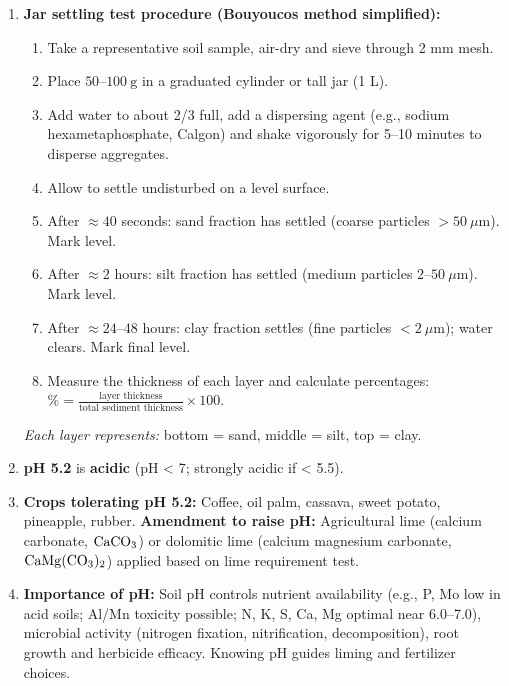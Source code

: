 \documentclass[11pt]{article}
\begin{document}
\begin{corrige}
\begin{enumerate}
\item \textbf{Jar settling test procedure (Bouyoucos method simplified):}
\begin{enumerate}
\item Take a representative soil sample, air-dry and sieve through 2 mm mesh.
\item Place $50\text{--}100\ \mathrm{g}$ in a graduated cylinder or tall jar (1 L).
\item Add water to about 2/3 full, add a dispersing agent (e.g., sodium hexametaphosphate, Calgon) and shake vigorously for 5--10 minutes to disperse aggregates.
\item Allow to settle undisturbed on a level surface.
\item After $\approx 40$ seconds: sand fraction has settled (coarse particles $>50\ \mu\mathrm{m}$). Mark level.
\item After $\approx 2$ hours: silt fraction has settled (medium particles $2\text{--}50\ \mu\mathrm{m}$). Mark level.
\item After $\approx 24\text{--}48$ hours: clay fraction settles (fine particles $<2\ \mu\mathrm{m}$); water clears. Mark final level.
\item Measure the thickness of each layer and calculate percentages: $\% = \frac{\text{layer thickness}}{\text{total sediment thickness}} \times 100$.
\end{enumerate}
\textit{Each layer represents:} bottom = sand, middle = silt, top = clay.

\item \textbf{pH 5.2} is \textbf{acidic} (pH < 7; strongly acidic if < 5.5).
\item \textbf{Crops tolerating pH 5.2:} Coffee, oil palm, cassava, sweet potato, pineapple, rubber.  
  \textbf{Amendment to raise pH:} Agricultural lime (calcium carbonate, $\ce{CaCO3}$) or dolomitic lime (calcium magnesium carbonate, $\ce{CaMg(CO3)2}$) applied based on lime requirement test.
\item \textbf{Importance of pH:} Soil pH controls nutrient availability (e.g., P, Mo low in acid soils; Al/Mn toxicity possible; N, K, S, Ca, Mg optimal near 6.0--7.0), microbial activity (nitrogen fixation, nitrification, decomposition), root growth and herbicide efficacy. Knowing pH guides liming and fertilizer choices.
\end{enumerate}
\end{corrige}
\end{document}
